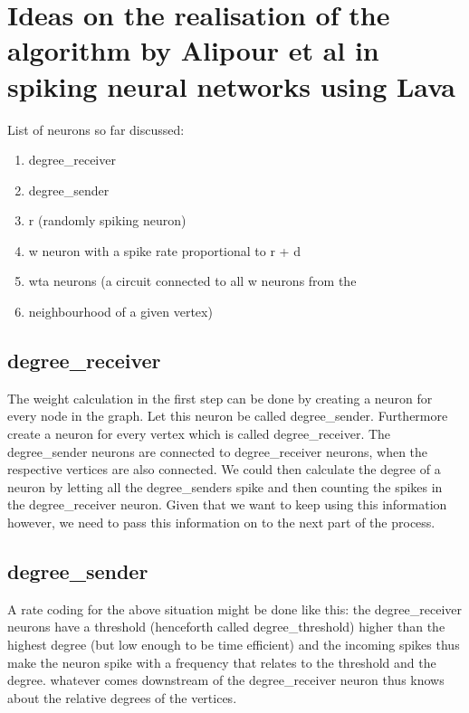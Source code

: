 \chapter{Ideas on the realisation of the algorithm by Alipour et al
in spiking neural networks using Lava}\label{chap:ideas_v1}
List of neurons so far discussed:
\begin{enumerate}
    \item degree_receiver
    \item degree_sender
    \item r (randomly spiking neuron)
    \item w neuron with a spike rate proportional to r + d
    \item wta neurons (a circuit connected to all w neurons from the
    \item neighbourhood of a given vertex)
\end{enumerate}

\section{degree_receiver}\label{sec:degree_receiver}
The weight calculation in the first step can be done by creating a neuron for
every node in the graph. Let this neuron be called degree_sender. Furthermore
create a neuron for every vertex which is called degree_receiver. The
degree_sender neurons are connected to degree_receiver neurons, when the
respective vertices are also connected. We could then calculate the degree of a
neuron by letting all the degree_senders spike and then counting the spikes in
the degree_receiver neuron. Given that we want to keep using this information
however, we need to pass this information on to the next part of the process.
\section{degree_sender}\label{sec:degree_sender}
A rate coding for the above situation might be done like this: the
degree_receiver neurons have a threshold (henceforth called
degree_threshold) higher than the highest degree (but low enough to be time
efficient) and the incoming spikes thus make the neuron spike with a frequency
that relates to the threshold and the degree. whatever comes downstream of
the degree_receiver neuron thus knows about the relative degrees of the
vertices.
